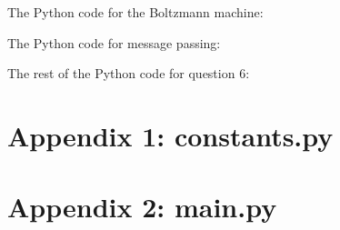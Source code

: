 \documentclass[12pt]{article}
\begin{document}
\newpage
The Python code for the Boltzmann machine:


\newpage
The Python code for message passing:


\newpage
The rest of the Python code for question 6:


\newpage
\section*{Appendix 1: constants.py}

\newpage
\section*{Appendix 2: main.py}

\end{document}

